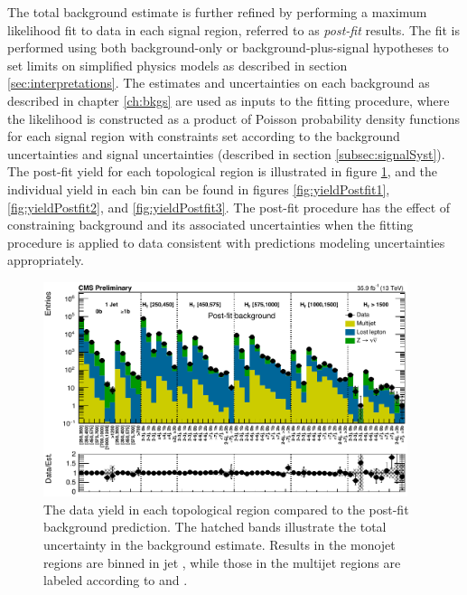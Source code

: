 The total background estimate is further refined by performing a maximum likelihood fit to data in each signal region, referred to as {\it post-fit} results. The fit is performed using both background-only or background-plus-signal hypotheses to set limits on simplified physics models as described in section \ref{sec:interpretations}. The estimates and uncertainties on each background as described in chapter \ref{ch:bkgs} are used as inputs to the fitting procedure, where the likelihood is constructed as a product of Poisson probability density functions for each signal region with constraints set according to the background uncertainties and signal uncertainties (described in section \ref{subsec:signalSyst}). The post-fit yield for each topological region is illustrated in figure \ref{fig:yieldPostfitTopological}, and the individual yield in each \mttwo bin can be found in figures \ref{fig:yieldPostfit1}, \ref{fig:yieldPostfit2}, and \ref{fig:yieldPostfit3}. The post-fit procedure has the effect of constraining background and its associated uncertainties when the fitting procedure is applied to data consistent with predictions modeling uncertainties appropriately.
\begin{figure}
	\centering
	\includegraphics[width=0.95\textwidth]{results/figs/postfit/mt2_ALL_fullEstimate}
	\renewcommand{\baselinestretch}{1.0}
	\caption[The data yield in each topological region compared to the post-fit background prediction.]{The data yield in each topological region compared to the post-fit background prediction. The hatched bands illustrate the total uncertainty in the background estimate. Results in the monojet regions are binned in jet \pt, while those in the multijet regions are labeled according to \nj and \nb.}
	\label{fig:yieldPostfitTopological}
\end{figure}
